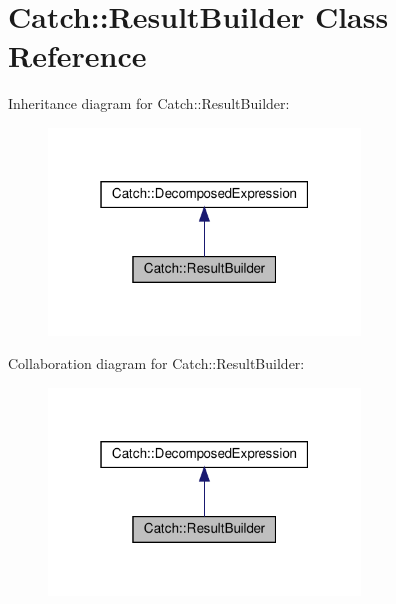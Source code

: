 \hypertarget{classCatch_1_1ResultBuilder}{}\section{Catch\+:\+:Result\+Builder Class Reference}
\label{classCatch_1_1ResultBuilder}


Inheritance diagram for Catch\+:\+:Result\+Builder\+:\nopagebreak
\begin{figure}[H]
\begin{center}
\leavevmode
\includegraphics[width=235pt]{classCatch_1_1ResultBuilder__inherit__graph}
\end{center}
\end{figure}


Collaboration diagram for Catch\+:\+:Result\+Builder\+:\nopagebreak
\begin{figure}[H]
\begin{center}
\leavevmode
\includegraphics[width=235pt]{classCatch_1_1ResultBuilder__coll__graph}
\end{center}
\end{figure}
